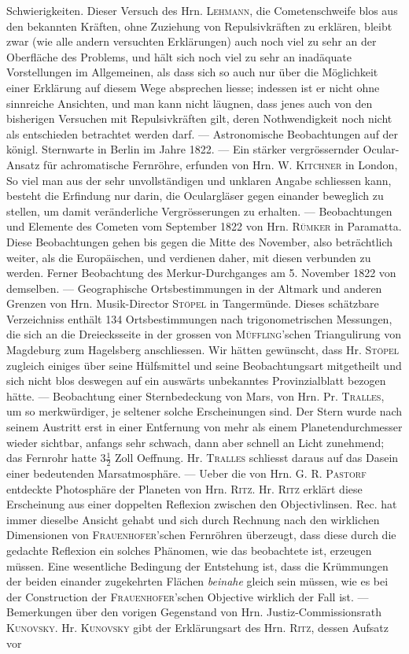 Schwierigkeiten. Dieser Versuch des Hrn. \textsc{Lehmann}, die Cometenschweife blos aus den bekannten Kräften, ohne Zuziehung von Repulsivkräften zu erklären, bleibt zwar (wie alle andern versuchten Erklärungen) auch noch viel zu sehr an der Oberfläche des Problems, und hält sich noch viel zu sehr an inadäquate Vorstellungen im Allgemeinen, als dass sich so auch nur über die Möglichkeit einer Erklärung auf diesem Wege absprechen liesse; indessen ist er nicht ohne sinnreiche Ansichten, und man kann nicht läugnen, dass jenes auch von den bisherigen Versuchen mit Repulsivkräften gilt, deren Nothwendigkeit noch nicht als entschieden betrachtet werden darf. --- Astronomische Beobachtungen auf der königl. Sternwarte in Berlin im Jahre 1822. --- Ein stärker vergrössernder Ocular-Ansatz für achromatische Fernröhre, erfunden von Hrn. W. \textsc{Kitchner} in London, So viel man aus der sehr unvollständigen und unklaren Angabe schliessen kann, besteht die Erfindung nur darin, die Oculargläser gegen einander beweglich zu stellen, um damit veränderliche Vergrösserungen zu erhalten. --- Beobachtungen und Elemente des Cometen vom September 1822 von Hrn. \textsc{Rümker} in Paramatta. Diese Beobachtungen gehen bis gegen die Mitte des November, also beträchtlich weiter, als die Europäischen, und verdienen daher, mit diesen verbunden zu werden. Ferner Beobachtung des Merkur-Durchganges am 5. November 1822 von demselben. --- Geographische Ortsbestimmungen in der Altmark und anderen Grenzen von Hrn. Musik-Director \textsc{Stöpel} in Tangermünde. Dieses schätzbare Verzeichniss enthält 134 Ortsbestimmungen nach trigonometrischen Messungen, die sich an die Dreiecksseite in der grossen von \textsc{Müffling}'schen Triangulirung von Magdeburg zum Hagelsberg anschliessen. Wir hätten gewünscht, dass Hr. \textsc{Stöpel} zugleich einiges über seine Hülfsmittel und seine  Beobachtungsart mitgetheilt und sich nicht blos deswegen auf ein auswärts unbekanntes Provinzialblatt bezogen hätte. --- Beobachtung einer Sternbedeckung von Mars, von Hrn. Pr. \textsc{Tralles}, um so merkwürdiger, je seltener solche Erscheinungen sind. Der Stern wurde nach seinem Austritt erst in einer Entfernung von mehr als einem Planetendurchmesser wieder sichtbar, anfangs sehr schwach, dann aber schnell an Licht zunehmend; das Fernrohr hatte $3\tfrac{1}{2}$ Zoll Oeffnung. Hr. \textsc{Tralles} schliesst daraus auf das Dasein einer bedeutenden Marsatmosphäre. --- Ueber die von Hrn. G. R. \textsc{Pastorf} entdeckte Photosphäre der Planeten von Hrn. \textsc{Ritz}. Hr. \textsc{Ritz} erklärt diese Erscheinung aus einer doppelten Reflexion zwischen den Objectivlinsen. Rec. hat immer dieselbe Ansicht gehabt und sich durch Rechnung nach den wirklichen Dimensionen von \textsc{Frauenhofer}'schen Fernröhren überzeugt, dass diese durch die gedachte Reflexion ein solches Phänomen, wie das beobachtete ist, erzeugen müssen. Eine wesentliche Bedingung der Entstehung ist, dass die Krümmungen der beiden einander zugekehrten Flächen \emph{beinahe} gleich sein müssen, wie es bei der Construction der \textsc{Frauenhofer}'schen Objective wirklich der Fall ist. --- Bemerkungen über den vorigen Gegenstand von Hrn. Justiz-Commissionsrath \textsc{Kunovsky}. Hr. \textsc{Kunovsky} gibt der Erklärungsart des Hrn. \textsc{Ritz}, dessen Aufsatz vor 